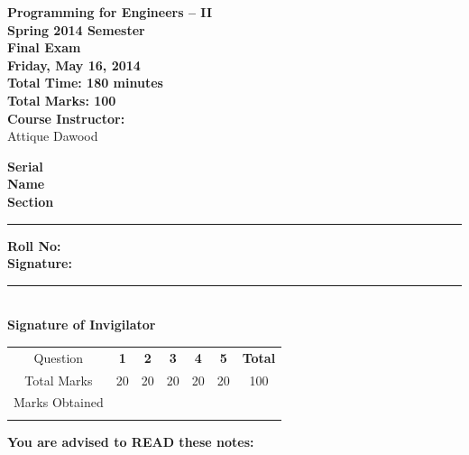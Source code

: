 \documentclass[12pt,a4paper]{article}
\def\QOne{20}
\def\Qtwo{20}
\def\Qthree{20}
\def\Qfour{20}
\def\Qfive{20}
\def\TotalMarks{100}
\begin{document}
\begin{minipage}{0.55\textwidth}
{\LARGE \textbf{Programming for Engineers -- II}}\\[0.15cm]
{\normalsize \textbf{Spring 2014 Semester}}\\
{\Large \textbf{Final Exam}}\\
{\normalsize \textbf{Friday, May 16, 2014}}\\[0.30cm]
{\Large \textbf{Total Time: 180 minutes}}\\[0.15cm]
{\Large \textbf{Total Marks: 100}}\\
\textbf{Course Instructor:}\\
Attique Dawood\\
\end{minipage}
\begin{minipage}{0.4\textwidth}
\textbf{Serial} \hrulefill \\[0.25cm]
\textbf{Name} \hrulefill\\[0.25cm]
\textbf{Section} \rule{1cm}{0.2mm} \textbf{Roll No:} \hrulefill\\[0.25cm]
\textbf{Signature:} \hrulefill\\[0.25cm]
\rule{6.6cm}{0.2mm}\\
\textbf{Signature of Invigilator}\\[0.25cm]
\end{minipage}
\begin{table}[H]
\begin{center}
\vspace{0.3cm}
	{\large \begin{tabular}{!{\vrule width 1pt}c!{\vrule width 1pt}c!{\vrule width 1pt}c!{\vrule width 1pt}c!{\vrule width 1pt}c!{\vrule width 1pt}c!{\vrule width 1pt}c!{\vrule width 1pt}}
		\rule{0pt}{2.6ex} Question & \textbf{1} & \textbf{2} & \textbf{3} & \textbf{4} & \textbf{5} & \textbf{Total}\\
		Total Marks \rule{0pt}{2.6ex} & \QOne & \Qtwo & \Qthree & \Qfour & \Qfive & \TotalMarks\\
		Marks Obtained \rule{0pt}{2.6ex} & & & & & &\\
	\end{tabular}}
\end{center}
\end{table}
\noindent \textbf{You are advised to READ these notes:}
\end{document}
